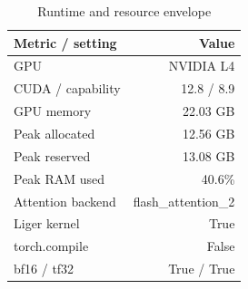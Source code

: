 \documentclass{article}
\begin{document}
\begin{table}[htbp]
  \centering
  \caption{Runtime and resource envelope}
  \label{tab:runtime_resources}
  \begin{tabular}{lr}
    \toprule
    \textbf{Metric / setting} & \textbf{Value} \\
    \midrule
    GPU & NVIDIA L4 \\
    CUDA / capability & 12.8 / 8.9 \\
    GPU memory & 22.03 GB \\
    Peak allocated & 12.56 GB \\
    Peak reserved & 13.08 GB \\
    Peak RAM used & 40.6\% \\
    Attention backend & flash\_attention\_2 \\
    Liger kernel & True \\
    torch.compile & False \\
    bf16 / tf32 & True / True \\
    \bottomrule
  \end{tabular}
\end{table}
\end{document}

